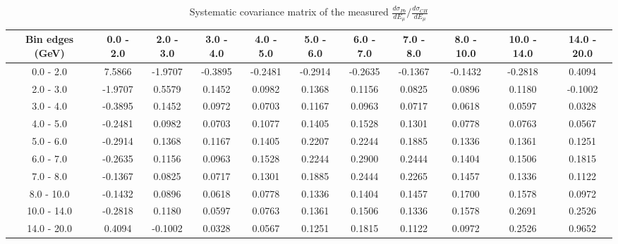 \documentclass[aps,prl,twocolumn,superscriptaddress,nofootinbib]{revtex4-1}
\begin{document}
\begin{turnpage}
 \begin{table}[h!]
  \centering
  \caption{Systematic covariance matrix of the measured $\frac{d\sigma_{Pb}}{dE_{\mu}}/\frac{d\sigma_{CH}}{dE_{\mu}}$}
    \begin{tabular}{c||cccccccccc}
      Bin edges (GeV) & 0.0 - 2.0 & 2.0 - 3.0 & 3.0 - 4.0 & 4.0 - 5.0 & 5.0 - 6.0 & 6.0 - 7.0 & 7.0 - 8.0 & 8.0 - 10.0 & 10.0 - 14.0 & 14.0 - 20.0 \\
\hline \hline
        0.0 - 2.0 &  7.5866 & -1.9707 & -0.3895 & -0.2481 & -0.2914 & -0.2635 & -0.1367 & -0.1432 & -0.2818 &  0.4094 \\
        2.0 - 3.0 & -1.9707 &  0.5579 &  0.1452 &  0.0982 &  0.1368 &  0.1156 &  0.0825 &  0.0896 &  0.1180 & -0.1002 \\
        3.0 - 4.0 & -0.3895 &  0.1452 &  0.0972 &  0.0703 &  0.1167 &  0.0963 &  0.0717 &  0.0618 &  0.0597 &  0.0328 \\
        4.0 - 5.0 & -0.2481 &  0.0982 &  0.0703 &  0.1077 &  0.1405 &  0.1528 &  0.1301 &  0.0778 &  0.0763 &  0.0567 \\
        5.0 - 6.0 & -0.2914 &  0.1368 &  0.1167 &  0.1405 &  0.2207 &  0.2244 &  0.1885 &  0.1336 &  0.1361 &  0.1251 \\
        6.0 - 7.0 & -0.2635 &  0.1156 &  0.0963 &  0.1528 &  0.2244 &  0.2900 &  0.2444 &  0.1404 &  0.1506 &  0.1815 \\
        7.0 - 8.0 & -0.1367 &  0.0825 &  0.0717 &  0.1301 &  0.1885 &  0.2444 &  0.2265 &  0.1457 &  0.1336 &  0.1122 \\
       8.0 - 10.0 & -0.1432 &  0.0896 &  0.0618 &  0.0778 &  0.1336 &  0.1404 &  0.1457 &  0.1700 &  0.1578 &  0.0972 \\
      10.0 - 14.0 & -0.2818 &  0.1180 &  0.0597 &  0.0763 &  0.1361 &  0.1506 &  0.1336 &  0.1578 &  0.2691 &  0.2526 \\
      14.0 - 20.0 &  0.4094 & -0.1002 &  0.0328 &  0.0567 &  0.1251 &  0.1815 &  0.1122 &  0.0972 &  0.2526 &  0.9652 \\
    \end{tabular}
  \label{tablecov:Pb_Systematic_Emu}
  \end{table}
\end{turnpage}
\end{document}
